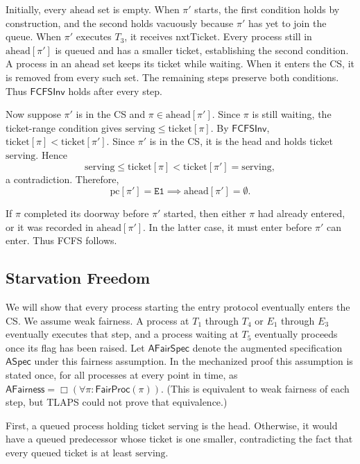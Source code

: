 \documentclass[12pt]{amsproc}
\begin{document}
Initially, every $\mathrm{ahead}$ set is empty. When $\pi'$ starts, the first condition holds by construction, and the second holds vacuously because $\pi'$ has yet to join the queue. When $\pi'$ executes $T_3$, it receives $\mathrm{nxtTicket}$. Every process still in $\mathrm{ahead}[\pi']$ is queued and has a smaller ticket, establishing the second condition.  A process in an $\mathrm{ahead}$ set keeps its ticket while waiting. When it enters the CS, it is removed from every such set. The remaining steps preserve both conditions. Thus $\mathsf{FCFSInv}$ holds after every step.

Now suppose $\pi'$ is in the CS and $\pi\in\mathrm{ahead}[\pi']$. Since $\pi$ is still waiting, the ticket-range condition gives $\mathrm{serving}\le\mathrm{ticket}[\pi]$. By $\mathsf{FCFSInv}$, $\mathrm{ticket}[\pi]<\mathrm{ticket}[\pi']$. Since $\pi'$ is in the CS, it is the head and holds ticket $\mathrm{serving}$. Hence
\[
    \mathrm{serving}
    \le \mathrm{ticket}[\pi]
    < \mathrm{ticket}[\pi']
    = \mathrm{serving},
\]
a contradiction. Therefore,
\[
    \mathrm{pc}[\pi']=\texttt{E1}
    \implies \mathrm{ahead}[\pi']=\emptyset.
\]

If $\pi$ completed its doorway before $\pi'$ started, then either $\pi$ had already entered, or it was recorded in $\mathrm{ahead}[\pi']$. In the latter case, it must enter before $\pi'$ can enter. Thus FCFS follows.


\subsection{Starvation Freedom}

\bbni

We will show that every process starting the entry protocol eventually enters the CS. We assume weak fairness. A process at $T_1$ through $T_4$ or $E_1$ through $E_3$ eventually executes that step, and a process waiting at $T_5$ eventually proceeds once its flag has been raised. Let $\mathsf{AFairSpec}$ denote the augmented specification $\mathsf{ASpec}$ under this fairness assumption. In the mechanized proof this assumption is stated once, for all processes at every point in time, as $\mathsf{AFairness} = \Box(\forall \pi : \mathsf{FairProc}(\pi))$. (This is equivalent to weak fairness of each step, but TLAPS could not prove that equivalence.)

First, a queued process holding ticket $\mathrm{serving}$ is the head. Otherwise, it would have a queued predecessor whose ticket is one smaller, contradicting the fact that every queued ticket is at least $\mathrm{serving}$.
\end{document}
